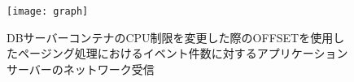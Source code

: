 \documentclass[../../../../../main]{subfiles}
\begin{document}
    \begin{figure}[H]
        \centering
        \texttt{[image: graph]}
        \caption{DBサーバーコンテナのCPU制限を変更した際のOFFSETを使用したページング処理におけるイベント件数に対するアプリケーションサーバーのネットワーク受信}
        \label{fig:paging-offset-change-db-cpu-limit-app-net-in-app_4_8192-db_1024}
    \end{figure}
\end{document}

